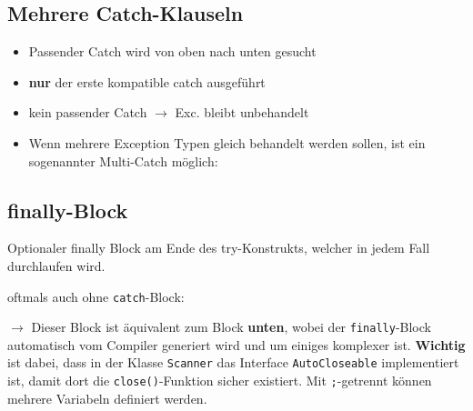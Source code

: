 	\subsection*{Mehrere Catch-Klauseln}
		\begin{minipage}{8.5cm}
			\begin{itemize}[noitemsep]
				\item Passender Catch wird von oben nach unten gesucht
				\item \textbf{nur} der erste kompatible catch ausgeführt
				\item kein passender Catch $\rightarrow$ Exc. bleibt unbehandelt
			\end{itemize}
			
		\end{minipage}
		\hspace{0.5cm}
		\begin{minipage}{9.8cm}
			\begin{itemize}[noitemsep]
				\item Wenn mehrere Exception Typen gleich behandelt werden sollen, ist ein sogenannter Multi-Catch möglich:
			\end{itemize}
			
		\end{minipage}
	\subsection*{finally-Block}
		Optionaler finally Block am Ende des try-Konstrukts, welcher in jedem Fall durchlaufen wird.\\
		\begin{minipage}[t]{9cm}
			
			oftmals auch ohne \texttt{catch}-Block:
			
		\end{minipage}
		\hspace*{0.5cm}
		\begin{minipage}[t]{9.3cm}
			
			$\rightarrow$ Dieser Block ist äquivalent zum Block \textbf{unten}, wobei der \texttt{finally}-Block automatisch vom Compiler generiert wird und um einiges komplexer ist. \textbf{Wichtig} ist dabei, dass in der Klasse \texttt{Scanner} das Interface \texttt{AutoCloseable} implementiert ist, damit dort die \texttt{close()}-Funktion sicher existiert. Mit  \texttt{;}-getrennt können mehrere Variabeln definiert werden.
			
		\end{minipage}
		